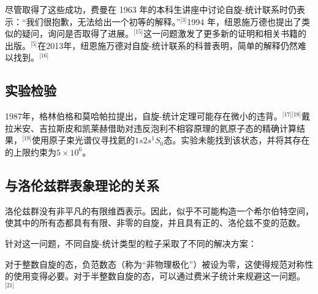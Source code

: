 尽管取得了这些成功，费曼在 1963 年的本科生讲座中讨论自旋-统计联系时仍表示：“我们很抱歉，无法给出一个初等的解释。”\(^\text{[3]}\)1994 年，纽恩施万德也提出了类似的疑问，询问是否取得了进展。\(^\text{[15]}\)这一问题激发了更多新的证明和相关书籍的出版。\(^\text{[5]}\)在2013年，纽恩施万德对自旋-统计联系的科普表明，简单的解释仍然难以找到。\(^\text{[16]}\)
\subsection{实验检验}
1987年，格林伯格和莫哈帕拉提出，自旋-统计定理可能存在微小的违背。\(^\text{[17][18]}\)戴拉米安、吉拉斯皮和凯莱赫借助对违反泡利不相容原理的氦原子态的精确计算结果，\(^\text{[19]}\)使用原子束光谱仪寻找氦的\(1s2s^1S_0\)态。实验未能找到该状态，并将其存在的上限约束为\(5\times10^{6}\)。
\subsection{与洛伦兹群表象理论的关系}  
洛伦兹群没有非平凡的有限维酉表示。因此，似乎不可能构造一个希尔伯特空间，使其中的所有态都具有有限、非零的自旋，并且具有正的、洛伦兹不变的范数。  

针对这一问题，不同自旋-统计类型的粒子采取了不同的解决方案：  

对于整数自旋的态，负范数态（称为“非物理极化”）被设为零，这使得规范对称性的使用变得必要。对于半整数自旋的态，可以通过费米子统计来规避这一问题。\(^\text{[21]}\)